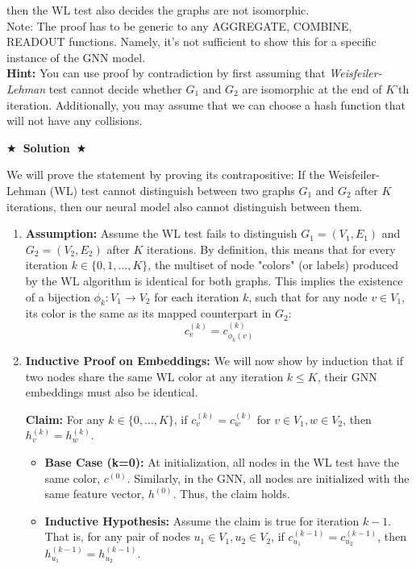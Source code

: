 \documentclass{article}
\numberwithin{figure}{section}
\newcommand{\Solution}[1]{%
	{%
		\medskip
		\color{red}
		\bf $\bigstar$~\sf\textbf{Solution}~$\bigstar$ \sf
		#1
	}
	\bigskip
}
\begin{document}
	then the WL test also decides the graphs are not isomorphic.\\
	
	Note: The proof has to be generic to any AGGREGATE, COMBINE, READOUT functions. Namely, it's not sufficient to show this for a specific instance of the GNN model.\\
	
	\textbf{Hint:} You can use proof by contradiction by first assuming that \textit{Weisfeiler-Lehman} test cannot decide whether $G_1$ and $G_2$ are isomorphic at the end of $K$’th iteration. Additionally, you may assume that we can choose a hash function that will not have any collisions.
	
	\Solution{
		We will prove the statement by proving its contrapositive: If the Weisfeiler-Lehman (WL) test cannot distinguish between two graphs $G_1$ and $G_2$ after $K$ iterations, then our neural model also cannot distinguish between them.
		
		\begin{enumerate}
			\item \textbf{Assumption:} Assume the WL test fails to distinguish $G_1 = (V_1, E_1)$ and $G_2 = (V_2, E_2)$ after $K$ iterations. By definition, this means that for every iteration $k \in \{0, 1, \dots, K\}$, the multiset of node "colors" (or labels) produced by the WL algorithm is identical for both graphs. This implies the existence of a bijection $\phi_k: V_1 \rightarrow V_2$ for each iteration $k$, such that for any node $v \in V_1$, its color is the same as its mapped counterpart in $G_2$:
			\[ c_v^{(k)} = c_{\phi_k(v)}^{(k)} \]
			
			\item \textbf{Inductive Proof on Embeddings:} We will now show by induction that if two nodes share the same WL color at any iteration $k \le K$, their GNN embeddings must also be identical.
			
			\textbf{Claim:} For any $k \in \{0, \dots, K\}$, if $c_v^{(k)} = c_w^{(k)}$ for $v \in V_1, w \in V_2$, then $h_v^{(k)} = h_w^{(k)}$.
			
			\begin{itemize}
				\item \textbf{Base Case (k=0):} At initialization, all nodes in the WL test have the same color, $c^{(0)}$. Similarly, in the GNN, all nodes are initialized with the same feature vector, $h^{(0)}$. Thus, the claim holds.
				
				\item \textbf{Inductive Hypothesis:} Assume the claim is true for iteration $k-1$. That is, for any pair of nodes $u_1 \in V_1, u_2 \in V_2$, if $c_{u_1}^{(k-1)} = c_{u_2}^{(k-1)}$, then $h_{u_1}^{(k-1)} = h_{u_2}^{(k-1)}$.
				

\end{itemize}
\end{enumerate}}
\end{document}
